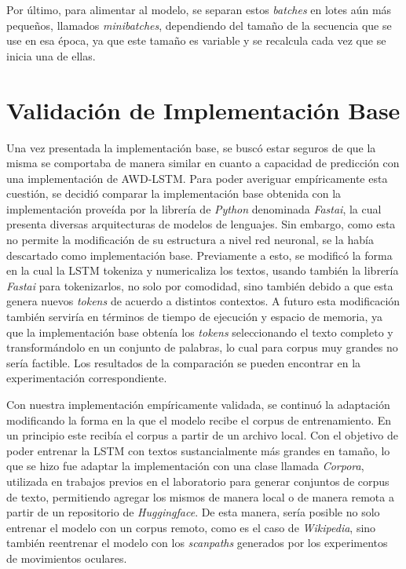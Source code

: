 Por último, para alimentar al modelo, se separan estos \textit{batches} en lotes aún más pequeños, llamados \textit{minibatches}, dependiendo del tamaño de la secuencia que se use en esa época, ya que este tamaño es variable y se recalcula cada vez que se inicia una de ellas. \parencite{merity2017regularizingoptimizinglstmlanguage}

\section{Validación de Implementación Base}

\label{sec:validacion_base}

Una vez presentada la implementación base, se buscó estar seguros de que la misma se comportaba de manera similar en cuanto a capacidad de predicción con una implementación de AWD-LSTM. Para poder averiguar empíricamente esta cuestión, se decidió comparar la implementación base obtenida con la implementación proveída por la librería de \textit{Python} denominada \textit{Fastai}, la cual presenta diversas arquitecturas de modelos de lenguajes. Sin embargo, como esta no permite la modificación de su estructura a nivel red neuronal, se la había descartado como implementación base.
Previamente a esto, se modificó la forma en la cual la LSTM tokeniza y numericaliza los textos, usando también la librería \textit{Fastai} para tokenizarlos, no solo por comodidad, sino también debido a que esta genera nuevos \textit{tokens} de acuerdo a distintos contextos. A futuro esta modificación también serviría en términos de tiempo de ejecución y espacio de memoria, ya que la implementación base obtenía los \textit{tokens} seleccionando el texto completo y transformándolo en un conjunto de palabras, lo cual para corpus muy grandes no sería factible. Los resultados de la comparación se pueden encontrar en la experimentación correspondiente.

Con nuestra implementación empíricamente validada, se continuó la adaptación modificando la forma en la que el modelo recibe el corpus de entrenamiento. En un principio este recibía el corpus a partir de un archivo local. Con el objetivo de poder entrenar la LSTM con textos sustancialmente más grandes en tamaño, lo que se hizo fue adaptar la implementación con una clase llamada \textit{Corpora}, utilizada en trabajos previos en el laboratorio para generar conjuntos de corpus de texto, permitiendo agregar los mismos de manera local o de manera remota a partir de un repositorio de \textit{Huggingface}. De esta manera, sería posible no solo entrenar el modelo con un corpus remoto, como es el caso de \textit{Wikipedia}, sino también reentrenar el modelo con los \textit{scanpaths} generados por los experimentos de movimientos oculares.


